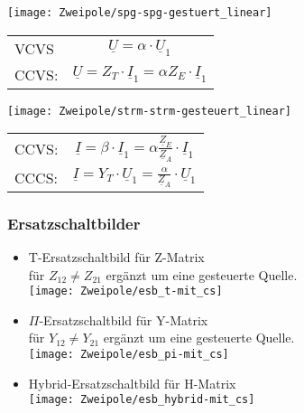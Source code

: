 \begin{mdframed}[style=exercise,frametitle=Linear]
    \begin{center}
        \texttt{[image: Zweipole/spg-spg-gestuert\_linear]}\\
    \begin{tabular}{l c}
        VCVS& $\underline{U}=\alpha\cdot \underline{U}_1$\\
        CCVS:& $\underline{U}=Z_T\cdot \underline{I}_1 = \alpha Z_E\cdot \underline{I}_1 $\\
    \end{tabular}
    \end{center}
    \begin{center}
        \texttt{[image: Zweipole/strm-strm-gesteuert\_linear]}\\
    \begin{tabular}{l c}
        CCVS:& $\underline{I}=\beta\cdot \underline{I}_1 = \alpha \frac{\underline{Z}_E}{\underline{Z}_{A}}\cdot \underline{I}_1$\\
        CCCS:& $\underline{I}=Y_T\cdot \underline{U}_1 = \frac{\alpha}{\underline{Z}_{A}}\cdot \underline{U}_1$\\
    \end{tabular}
    \end{center}
\end{mdframed}
\subsubsection{Ersatzschaltbilder}
\begin{itemize}
    \item T-Ersatzschaltbild für Z-Matrix\\
        für $Z_{12} \neq Z_{21}$ ergänzt um eine gesteuerte Quelle.\\
        \centering\texttt{[image: Zweipole/esb\_t-mit\_cs]}

        \raggedright
    \item $\Pi$-Ersatzschaltbild für Y-Matrix\\
        für $Y_{12} \neq Y_{21}$ ergänzt um eine gesteuerte Quelle.\\
        \centering\texttt{[image: Zweipole/esb\_pi-mit\_cs]}

        \raggedright
    \item  Hybrid-Ersatzschaltbild für H-Matrix\\
        \centering\texttt{[image: Zweipole/esb\_hybrid-mit\_cs]}
\end{itemize}


